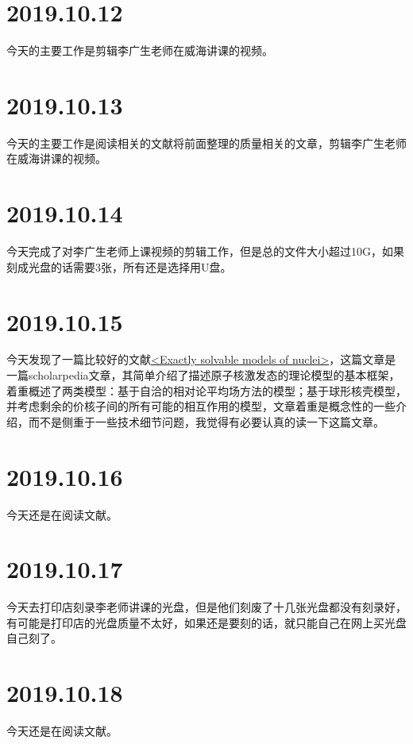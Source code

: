 \section{2019.10.12}
今天的主要工作是剪辑李广生老师在威海讲课的视频。

\section{2019.10.13}
今天的主要工作是阅读相关的文献将前面整理的质量相关的文章，剪辑李广生老师在威海讲课的视频。

\section{2019.10.14}
今天完成了对李广生老师上课视频的剪辑工作，但是总的文件大小超过10G，如果刻成光盘的话需要3张，所有还是选择用U盘。

\section{2019.10.15}
今天发现了一篇比较好的文献\href{https://www.doi.org/10.4249/scholarpedia.31279}{<Exactly solvable models of nuclei>}\cite{RN1176}，这篇文章是一篇scholarpedia文章，其简单介绍了描述原子核激发态的理论模型的基本框架，着重概述了两类模型：基于自洽的相对论平均场方法的模型；基于球形核壳模型，并考虑剩余的价核子间的所有可能的相互作用的模型，文章着重是概念性的一些介绍，而不是侧重于一些技术细节问题，我觉得有必要认真的读一下这篇文章。

\section{2019.10.16}
今天还是在阅读文献\cite{RN1176}。

\section{2019.10.17}
今天去打印店刻录李老师讲课的光盘，但是他们刻废了十几张光盘都没有刻录好，有可能是打印店的光盘质量不太好，如果还是要刻的话，就只能自己在网上买光盘自己刻了。

\section{2019.10.18}
今天还是在阅读文献\cite{RN1176}。